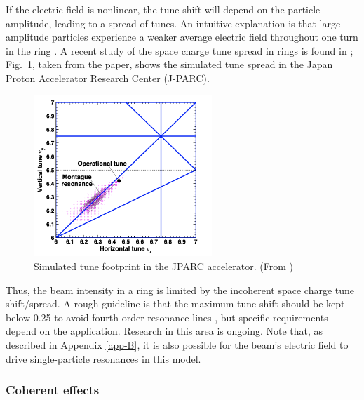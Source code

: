 If the electric field is nonlinear, the tune shift will depend on the particle amplitude, leading to a spread of tunes. An intuitive explanation is that large-amplitude particles experience a weaker average electric field throughout one turn in the ring \cite{Franchetti2017}. A recent study of the space charge tune spread in rings is found in \cite{Hotchi2020}; Fig.~\ref{fig:jparc_montague}, taken from the paper, shows the simulated tune spread in the Japan Proton Accelerator Research Center (J-PARC).
%
\begin{figure}[!p]
    \centering
    \includegraphics[width=0.6\textwidth]{Images/chapter1/montague.png}
    \caption{Simulated tune footprint in the JPARC accelerator. (From \cite{Hotchi2020})}
    \label{fig:jparc_montague}
\end{figure}
%

Thus, the beam intensity in a ring is limited by the incoherent space charge tune shift/spread. A rough guideline is that the maximum tune shift should be kept below 0.25 to avoid fourth-order resonance lines \cite{book:Reiser}, but specific requirements depend on the application. Research in this area is ongoing. Note that, as described in Appendix \ref{app-B}, it is also possible for the beam's electric field to drive single-particle resonances in this model.



\subsubsection{Coherent effects}

